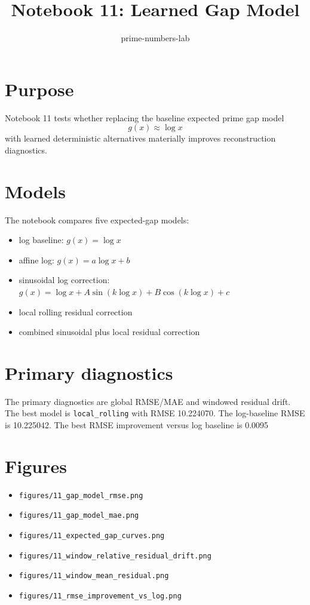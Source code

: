 \documentclass[11pt]{article}
\title{Notebook 11: Learned Gap Model}
\author{prime-numbers-lab}
\date{}
\begin{document}
\maketitle

\section*{Purpose}
Notebook 11 tests whether replacing the baseline expected prime gap model
\[
  g(x) \approx \log x
\]
with learned deterministic alternatives materially improves reconstruction diagnostics.

\section*{Models}
The notebook compares five expected-gap models:
\begin{itemize}
  \item log baseline: $g(x)=\log x$
  \item affine log: $g(x)=a\log x+b$
  \item sinusoidal log correction: $g(x)=\log x + A\sin(k\log x)+B\cos(k\log x)+c$
  \item local rolling residual correction
  \item combined sinusoidal plus local residual correction
\end{itemize}

\section*{Primary diagnostics}
The primary diagnostics are global RMSE/MAE and windowed residual drift.
The best model is \texttt{local_rolling} with RMSE 10.224070.
The log-baseline RMSE is 10.225042.
The best RMSE improvement versus log baseline is 0.0095%

\section*{Figures}
\begin{itemize}
  \item \texttt{figures/11\_gap\_model\_rmse.png}
  \item \texttt{figures/11\_gap\_model\_mae.png}
  \item \texttt{figures/11\_expected\_gap\_curves.png}
  \item \texttt{figures/11\_window\_relative\_residual\_drift.png}
  \item \texttt{figures/11\_window\_mean\_residual.png}
  \item \texttt{figures/11\_rmse\_improvement\_vs\_log.png}
\end{itemize}
\end{document}
